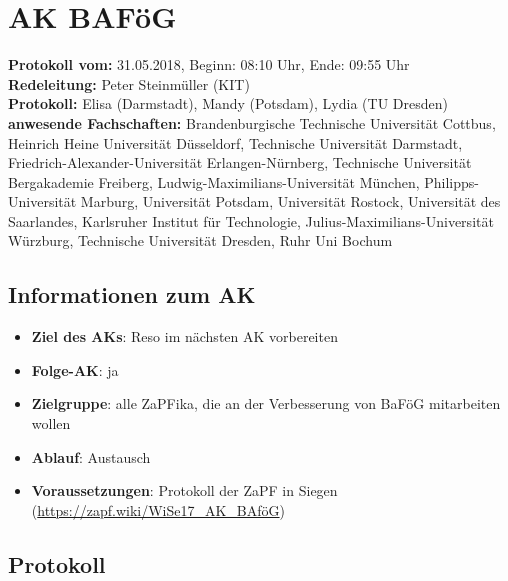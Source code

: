 
\section{AK BAFöG}

  \textbf{Protokoll vom:} 31.05.2018,
  Beginn: 08:10 Uhr,
  Ende: 09:55 Uhr \\
  \textbf{Redeleitung:} Peter Steinmüller (KIT) \\
  \textbf{Protokoll:} Elisa (Darmstadt), Mandy (Potsdam), Lydia (TU Dresden) \\
  \textbf{anwesende Fachschaften:} Brandenburgische Technische Universität Cottbus, Heinrich Heine Universität Düsseldorf, Technische Universität Darmstadt, Friedrich-Alexander-Universität Erlangen-Nürnberg, Technische Universität Bergakademie Freiberg, Ludwig-Maximilians-Universität München, Philipps-Universität Marburg, Universität Potsdam, Universität Rostock, Universität des Saarlandes, Karlsruher Institut für Technologie, Julius-Maximilians-Universität Würzburg, Technische Universität Dresden, Ruhr Uni Bochum

  \subsection*{Informationen zum AK}
    \begin{itemize}
      \item \textbf{Ziel des AKs}: Reso im nächsten AK vorbereiten
      \item \textbf{Folge-AK}: ja
      \item \textbf{Zielgruppe}: alle ZaPFika, die an der Verbesserung von BaFöG mitarbeiten wollen
      \item \textbf{Ablauf}: Austausch
      \item \textbf{Voraussetzungen}: Protokoll der ZaPF in Siegen (\url{https://zapf.wiki/WiSe17_AK_BAföG})
    \end{itemize}

  \subsection*{Protokoll}
